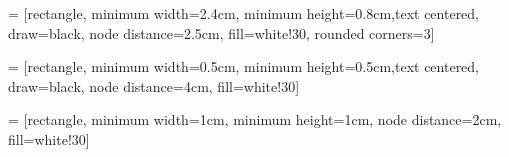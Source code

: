 \usepackage{amsmath}
\usepackage{geometry}
\usepackage{algorithm2e}
\usepackage{microtype}
\usepackage{fancyhdr}
\usepackage{hyperref}
\usepackage{datetime}

\usepackage[utf8]{inputenc}
\usepackage[graphicx]{realboxes}
\usepackage{hyperref}
\usepackage{blindtext}
\usepackage{enumitem}
\usepackage{scrextend}
\usepackage{subcaption}
\usepackage[english]{babel}
\usepackage{adjustbox}
\usepackage{array}
\usepackage[UKenglish]{isodate}

\usepackage{tikz}
\usepackage{mathtools}
\usepackage{relsize}
\usetikzlibrary{plotmarks,arrows,positioning,shapes,calc}

 = [rectangle, minimum width=2.4cm, minimum height=0.8cm,text centered, draw=black, node distance=2.5cm, fill=white!30, rounded corners=3]

 = [rectangle, minimum width=0.5cm, minimum height=0.5cm,text centered, draw=black, node distance=4cm, fill=white!30]

 = [rectangle, minimum width=1cm, minimum height=1cm, node distance=2cm, fill=white!30]

\usepackage{color, colortbl}

\usepackage[backend=bibtex]{biblatex}




\usepackage{lineno}

